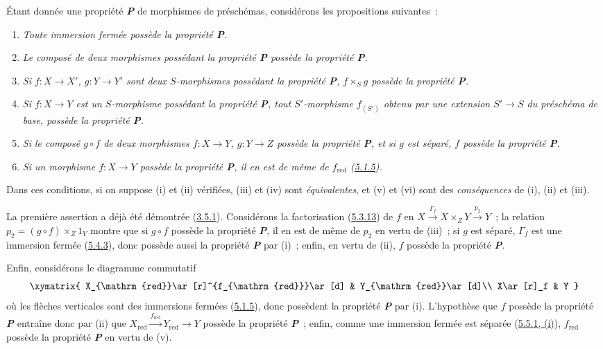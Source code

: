 \begin{remark}[5.5.12]
\label{I.5.5.12-fr}
\normalfont Étant donnée une propriété \textbf{\textit{P}} de morphismes de préschémas,
considérons les propositions suivantes~:
\begin{enumerate}
  \item[\rm(i)] \emph{Toute immersion fermée possède la propriété \textbf{\textup{P}}.}
  \item[\rm(ii)] \emph{Le composé de deux morphismes possédant la propriété
    \textbf{\textup{P}} possède la propriété \textbf{\textup{P}}.}
  \item[\rm(iii)] \emph{Si $f:X\to X'$, $g:Y\to Y'$ sont deux $S$-morphismes
    possédant la propriété \textbf{\textup{P}}, $f\times_S g$ possède la propriété
    \textbf{\textup{P}}.}

  \item[\rm(iv)] \emph{Si $f:X\to Y$ est un $S$-morphisme possédant la
    propriété \textbf{P}, tout $S'$-morphisme $f_{(S')}$ obtenu par une
    extension $S'\to S$ du préschéma de base, possède la propriété
    \textbf{P}.}
  \item[\rm(v)] \emph{Si le composé $g\circ f$ de deux morphismes
    $f:X\to Y$, $g:Y\to Z$ possède la propriété \textbf{P}, et si $g$ est
    séparé, $f$ possède la propriété \textbf{P}.}
  \item[\rm(vi)] \emph{Si un morphisme $f:X\to Y$ possède la propriété
    \textbf{P}, il en est de même de $f_{\mathrm{red}}$
    \textup{(\hyperref[I.5.1.5-fr]{5.1.5})}.}
\end{enumerate}

Dans ces conditions, si on suppose (i) et (ii) vérifiées, (iii) et (iv) sont
\emph{équivalentes}, et (v) et (vi) sont des \emph{conséquences} de (i), (ii)
et (iii).

La première assertion a déjà été démontrée
(\hyperref[I.3.5.1-fr]{3.5.1}). Considérons la factorisation
(\hyperref[I.5.3.13-fr]{5.3.13}) de $f$ en
$X\xrightarrow{\Gamma_f}X\times_Z Y\xrightarrow{p_2}Y$~; la relation
$p_2=(g\circ f)\times_Z 1_Y$ montre que si $g\circ f$ possède la propriété
\textbf{\textit{P}}, il en est de même de $p_2$ en vertu de (iii)~; si $g$ est séparé,
$\Gamma_f$ est une immersion fermée
(\hyperref[I.5.4.3-fr]{5.4.3}), donc possède aussi la propriété \textbf{\textit{P}} par
(i)~; enfin, en vertu de (ii), $f$ possède la propriété \textbf{\textit{P}}.

Enfin, considérons le diagramme commutatif
\[
  \xymatrix{
    X_{\mathrm{red}}\ar[r]^{f_{\mathrm{red}}}\ar[d] &
    Y_{\mathrm{red}}\ar[d]\\
    X\ar[r]_f &
    Y
  }
\]
où les flèches verticales sont des immersions fermées
(\hyperref[I.5.1.5-fr]{5.1.5}), donc possèdent la propriété \textbf{\textit{P}} par
(i). L'hypothèse que $f$ possède la propriété \textbf{\textit{P}} entraîne donc par
(ii) que
$X_{\mathrm{red}}\xrightarrow{f_{\mathrm{red}}}Y_{\mathrm{red}}\to Y$
possède la propriété \textbf{\textit{P}}~; enfin, comme une immersion fermée est
séparée (\hyperref[I.5.5.1-fr]{5.5.1, (i)}), $f_{\mathrm{red}}$ possède la
propriété \textbf{\textit{P}} en vertu de (v).


\end{remark}
